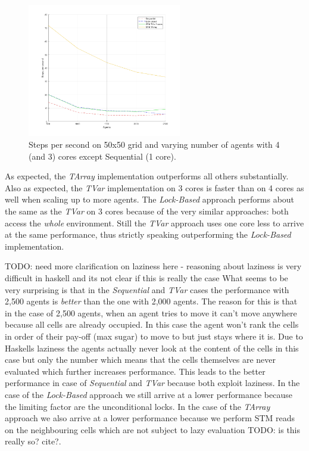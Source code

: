 \begin{figure}
	\centering
	\includegraphics[width=0.6\textwidth, angle=0]{./fig/sugarscape/varying_agents.png}
	\caption{Steps per second on 50x50 grid and varying number of agents with 4 (and 3) cores except Sequential (1 core).}
	\label{fig:state_results_agentsscale_time}
\end{figure}

As expected, the \textit{TArray} implementation outperforms all others substantially. Also as expected, the \textit{TVar} implementation on 3 cores is faster than on 4 cores as well when scaling up to more agents. The \textit{Lock-Based} approach performs about the same as the \textit{TVar} on 3 cores because of the very similar approaches: both access the \textit{whole} environment. Still the \textit{TVar} approach uses one core less to arrive at the same performance, thus strictly speaking outperforming the \textit{Lock-Based} implementation.

TODO: need more clarification on laziness here - reasoning about laziness is very difficult in haskell and its not clear if this is really the case
What seems to be very surprising is that in the \textit{Sequential} and \textit{TVar} cases the performance with 2,500 agents is \textit{better} than the one with 2,000 agents. The reason for this is that in the case of 2,500 agents, when an agent tries to move it can't move anywhere because all cells are already occupied. In this case the agent won't rank the cells in order of their pay-off (max sugar) to move to but just stays where it is.  Due to Haskells laziness the agents actually never look at the content of the cells in this case but only the number which means that the cells themselves are never evaluated which further increases performance. This leads to the better performance in case of \textit{Sequential} and \textit{TVar} because both exploit laziness.
In the case of the \textit{Lock-Based} approach we still arrive at a lower performance because the limiting factor are the unconditional locks. In the case of the \textit{TArray} approach we also arrive at a lower performance because we perform STM reads on the neighbouring cells which are not subject to lazy evaluation TODO: is this really so? cite?.

